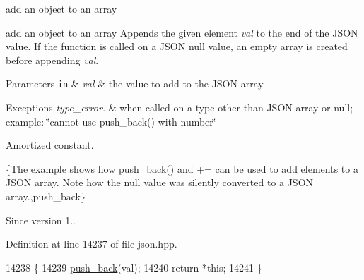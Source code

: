 add an object to an array 

add an object to an array Appends the given element {\itshape val} to the end of the J\+S\+ON value. If the function is called on a J\+S\+ON null value, an empty array is created before appending {\itshape val}.


\begin{DoxyParams}[1]{Parameters}
\mbox{\tt in}  & {\em val} & the value to add to the J\+S\+ON array\\
\hline
\end{DoxyParams}

\begin{DoxyExceptions}{Exceptions}
{\em type\+\_\+error.} & when called on a type other than J\+S\+ON array or null; example\+: {\ttfamily \char`\"{}cannot use push\+\_\+back() with number\char`\"{}}\\
\hline
\end{DoxyExceptions}
Amortized constant.

\{The example shows how {\ttfamily \hyperlink{classnlohmann_1_1basic__json_ac8e523ddc8c2dd7e5d2daf0d49a9c0d7}{push\+\_\+back()}} and {\ttfamily +=} can be used to add elements to a J\+S\+ON array. Note how the {\ttfamily null} value was silently converted to a J\+S\+ON array.,push\+\_\+back\}

\begin{DoxySince}{Since}
version 1.. 
\end{DoxySince}


Definition at line 14237 of file json.\+hpp.


\begin{DoxyCode}
14238     \{
14239         \hyperlink{classnlohmann_1_1basic__json_ac8e523ddc8c2dd7e5d2daf0d49a9c0d7}{push\_back}(val);
14240         \textcolor{keywordflow}{return} *\textcolor{keyword}{this};
14241     \}
\end{DoxyCode}
\mbox{\label{classnlohmann_1_1basic__json_abf04978d85a2d5c4754f4806d42f46fd}} 
